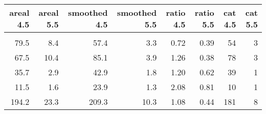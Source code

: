 \begin{tabular}{rrrrrrrr}
\toprule
 areal 4.5 &  areal 5.5 &  smoothed 4.5 &  smoothed 5.5 &  ratio 4.5 &  ratio 5.5 &  cat 4.5 &  cat 5.5 \\
\midrule
           &            &               &               &            &            &          &          \\
      79.5 &        8.4 &          57.4 &           3.3 &       0.72 &       0.39 &       54 &        3 \\
      67.5 &       10.4 &          85.1 &           3.9 &       1.26 &       0.38 &       78 &        3 \\
      35.7 &        2.9 &          42.9 &           1.8 &       1.20 &       0.62 &       39 &        1 \\
      11.5 &        1.6 &          23.9 &           1.3 &       2.08 &       0.81 &       10 &        1 \\
     194.2 &       23.3 &         209.3 &          10.3 &       1.08 &       0.44 &      181 &        8 \\
\bottomrule
\end{tabular}
